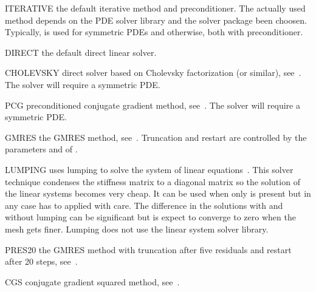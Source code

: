 \begin{memberdesc}[LinearPDE]{ITERATIVE}
the default iterative method and preconditioner. The actually used method depends on the
PDE solver library and the solver package been choosen. Typically, \PCG is used for symmetric PDEs
and \BiCGStab otherwise, both with \JACOBI preconditioner.
\end{memberdesc}

\begin{memberdesc}[LinearPDE]{DIRECT}
the default direct linear solver.
\end{memberdesc}

\begin{memberdesc}[LinearPDE]{CHOLEVSKY}
direct solver based on Cholevsky factorization (or similar), see~. The solver will require a symmetric PDE.
\end{memberdesc}

\begin{memberdesc}[LinearPDE]{PCG}
preconditioned conjugate gradient method, see~. The solver will require a symmetric PDE.
\end{memberdesc}

\begin{memberdesc}[LinearPDE]{GMRES}
the GMRES method, see~. Truncation and restart are controlled by the parameters
 and  of .
\end{memberdesc}

\begin{memberdesc}[LinearPDE]{LUMPING}
uses lumping to solve the system of linear equations~. This solver technique
condenses the stiffness matrix to a diagonal matrix so the solution of the linear systems becomes very cheap. It can be used when
only  is present but in any case has to applied with care. The difference in the solutions with and without lumping can be significant
but is expect to converge to zero when the mesh gets finer.
Lumping does not use the linear system solver library.
\end{memberdesc}

\begin{memberdesc}[LinearPDE]{PRES20}
the GMRES method with truncation after five residuals and
restart after 20 steps, see~.
\end{memberdesc}

\begin{memberdesc}[LinearPDE]{CGS}
conjugate gradient squared method, see~.
\end{memberdesc}

